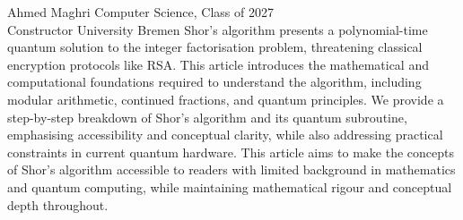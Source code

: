 \label{art:shor}

  {Ahmed Maghri}
  {Computer Science, Class of 2027\\Constructor University Bremen}
  {Shor's algorithm presents a polynomial-time quantum solution to the
   integer factorisation problem, threatening classical encryption protocols
   like RSA\@.  This article introduces the mathematical and computational
   foundations required to understand the algorithm, including modular
   arithmetic, continued fractions, and quantum principles.  We provide a
   step-by-step breakdown of Shor's algorithm and its quantum subroutine,
   emphasising accessibility and conceptual clarity, while also addressing
   practical constraints in current quantum hardware.  This article aims to
   make the concepts of Shor's algorithm accessible to readers with limited
   background in mathematics and quantum computing, while maintaining
   mathematical rigour and conceptual depth throughout.}

\vspace{0.3cm}
\vspace{0.6cm}


\setcounter{section}{-1}



